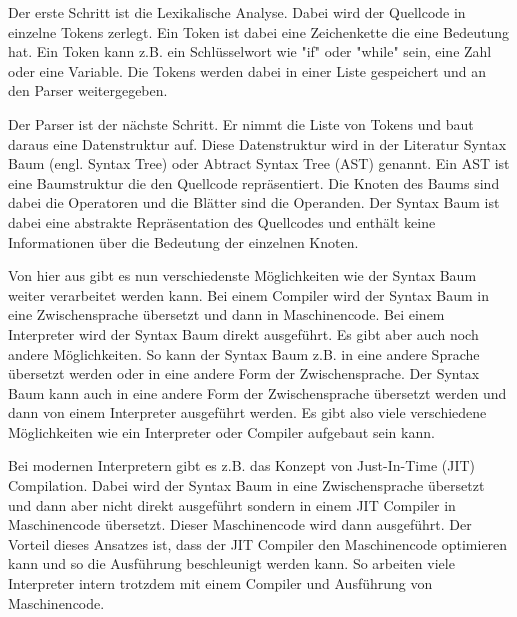 \documentclass[ngerman]{article}
\newcommand{\doublelinebreak}{\par\vspace{\baselineskip}}
\begin{document}
Der erste Schritt ist die Lexikalische Analyse. Dabei wird der Quellcode in einzelne Tokens zerlegt. Ein Token ist dabei eine Zeichenkette die eine Bedeutung hat. Ein Token kann z.B. ein Schlüsselwort wie "if" oder "while" sein, eine Zahl oder eine Variable. Die Tokens werden dabei in einer Liste gespeichert und an den Parser weitergegeben.

Der Parser ist der nächste Schritt. Er nimmt die Liste von Tokens und baut daraus eine Datenstruktur auf. Diese Datenstruktur wird in der Literatur Syntax Baum (engl. Syntax Tree) oder Abtract Syntax Tree (AST) genannt. Ein AST ist eine Baumstruktur die den Quellcode repräsentiert. Die Knoten des Baums sind dabei die Operatoren und die Blätter sind die Operanden. Der Syntax Baum ist dabei eine abstrakte Repräsentation des Quellcodes und enthält keine Informationen über die Bedeutung der einzelnen Knoten. 

\doublelinebreak

Von hier aus gibt es nun verschiedenste Möglichkeiten wie der Syntax Baum weiter verarbeitet werden kann. Bei einem Compiler wird der Syntax Baum in eine Zwischensprache übersetzt und dann in Maschinencode. Bei einem Interpreter wird der Syntax Baum direkt ausgeführt. Es gibt aber auch noch andere Möglichkeiten. So kann der Syntax Baum z.B. in eine andere Sprache übersetzt werden oder in eine andere Form der Zwischensprache. Der Syntax Baum kann auch in eine andere Form der Zwischensprache übersetzt werden und dann von einem Interpreter ausgeführt werden. Es gibt also viele verschiedene Möglichkeiten wie ein Interpreter oder Compiler aufgebaut sein kann.

Bei modernen Interpretern gibt es z.B. das Konzept von Just-In-Time (JIT) Compilation. Dabei wird der Syntax Baum in eine Zwischensprache übersetzt und dann aber nicht direkt ausgeführt sondern in einem JIT Compiler in Maschinencode übersetzt. Dieser Maschinencode wird dann ausgeführt. Der Vorteil dieses Ansatzes ist, dass der JIT Compiler den Maschinencode optimieren kann und so die Ausführung beschleunigt werden kann. So arbeiten viele Interpreter intern trotzdem mit einem Compiler und Ausführung von Maschinencode.
\end{document}
